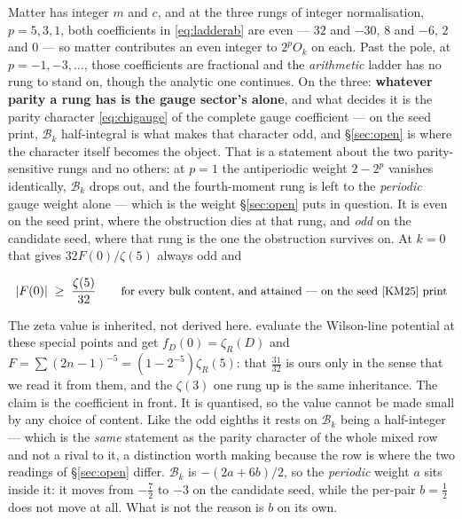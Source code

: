 \documentclass[11pt,a4paper]{article}
\newenvironment{keyeq}
  {\begin{center}\setlength{\fboxsep}{9pt}\setlength{\fboxrule}{0.8pt}%
   \begin{lrbox}{\keyeqbox}\begin{minipage}{0.88\textwidth}}
  {\end{minipage}\end{lrbox}%
   \fcolorbox{hdrblue!55}{hdrblue!6}{\usebox{\keyeqbox}}\end{center}}
\begin{document}
Matter has integer $m$ and $c$, and at the three rungs of integer normalisation, $p=5,3,1$, both
coefficients in \eqref{eq:ladderab} are even --- $32$ and $-30$, $8$ and $-6$, $2$ and $0$ --- so
matter contributes an even integer to $2^{p}O_k$ on each. Past the pole, at $p=-1,-3,\dots$, those
coefficients are fractional and the \emph{arithmetic} ladder has no rung to stand on, though the
analytic one continues. On the three:
\textbf{whatever parity a rung has is the gauge sector's alone}, and what decides it is the
parity character \eqref{eq:chigauge} of the complete gauge coefficient --- on the seed \cite{KM25}
print, $\mathcal{B}_k$ half-integral is what makes that character odd, and \S\ref{sec:open} is where
the character itself becomes the object. That is a statement about the two parity-sensitive rungs
and no others: at $p=1$ the antiperiodic weight $2-2^{p}$ vanishes identically, $\mathcal{B}_k$
drops out, and the fourth-moment rung is left to the \emph{periodic} gauge weight alone --- which
is the weight \S\ref{sec:open} puts in question. It is even on the seed \cite{KM25} print, where
the obstruction dies at that rung, and \emph{odd} on the candidate seed, where that rung is the
one the obstruction survives on. At $k=0$ that gives $32F(0)/\zeta(5)$ always odd and
\begin{keyeq}
\begin{equation}\label{eq:valuebound}
  |F(0)|\;\ge\;\frac{\zeta(5)}{32}\qquad
  \text{\small for every bulk content, and attained --- on the seed \cite{KM25} print}
\end{equation}
\end{keyeq}
The zeta value is inherited, not derived here. \cite{HHHK03} evaluate the Wilson-line potential at
these special points and get $f_D(0)=\zeta_R(D)$ and $F=\sum(2n-1)^{-5}=(1-2^{-5})\zeta_R(5)$: that
$\tfrac{31}{32}$ is ours only in the sense that we read it from them, and the $\zeta(3)$ one rung up
is the same inheritance. The claim is the coefficient in front. It is quantised, so the value
cannot be made small by any choice of content. Like the odd eighths it rests on $\mathcal{B}_k$ being
a half-integer --- which is the \emph{same} statement as the parity character of the whole mixed
row and not a rival to it, a distinction worth making because the row is where the two readings of
\S\ref{sec:open} differ. $\mathcal{B}_k$ is $-(2a+6b)/2$, so the \emph{periodic} weight $a$ sits
inside it: it moves from $-\tfrac72$ to $-3$ on the candidate seed, while the per-pair
$b=\tfrac12$ does not move at all. What is not the reason is $b$ on its own.
\end{document}
